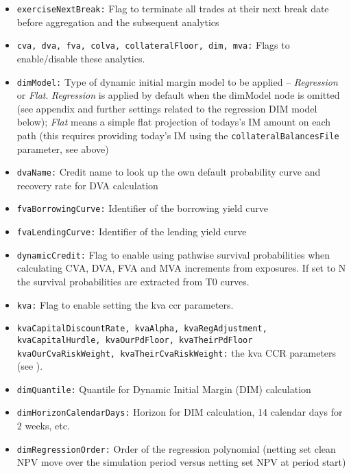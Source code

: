 {\begin{itemize}
\item {\tt exerciseNextBreak:} Flag to terminate all trades at their next break date before aggregation and the
subsequent analytics
\item {\tt cva, dva, fva, colva, collateralFloor, dim, mva:} Flags to enable/disable these analytics. 
\item {\tt dimModel:} Type of dynamic initial margin model to be applied -- {\em Regression} or {\em Flat}. {\em Regression}
  is applied by default when the dimModel node is omitted (see appendix and further settings related to the regression DIM
  model below); {\em Flat} means a simple flat projection of todays's IM amount on each path (this requires providing
  today's IM using the {\tt collateralBalancesFile} parameter, see above)
\item {\tt dvaName:} Credit name to look up the own default probability curve and recovery rate for DVA calculation
\item {\tt fvaBorrowingCurve:} Identifier of the borrowing yield curve
\item {\tt fvaLendingCurve:} Identifier of the lending yield curve
\item {\tt dynamicCredit:} Flag to enable using pathwise survival probabilities when calculating CVA, DVA, FVA and MVA increments from exposures. If set to N the survival probabilities are extracted from T0 curves.
\item {\tt kva:} Flag to enable setting the kva ccr parameters.
\item {\tt kvaCapitalDiscountRate, kvaAlpha, kvaRegAdjustment, kvaCapitalHurdle, kvaOurPdFloor, kvaTheirPdFloor kvaOurCvaRiskWeight, kvaTheirCvaRiskWeight:} the kva CCR parameters (see \cite{methods}).
\item {\tt dimQuantile:} Quantile for Dynamic Initial Margin (DIM) calculation
\item {\tt dimHorizonCalendarDays:} Horizon for DIM calculation, 14 calendar days for 2 weeks, etc.
\item {\tt dimRegressionOrder:} Order of the regression polynomial (netting set clean NPV move over the simulation
period versus netting set NPV at period start)

\end{itemize}}
